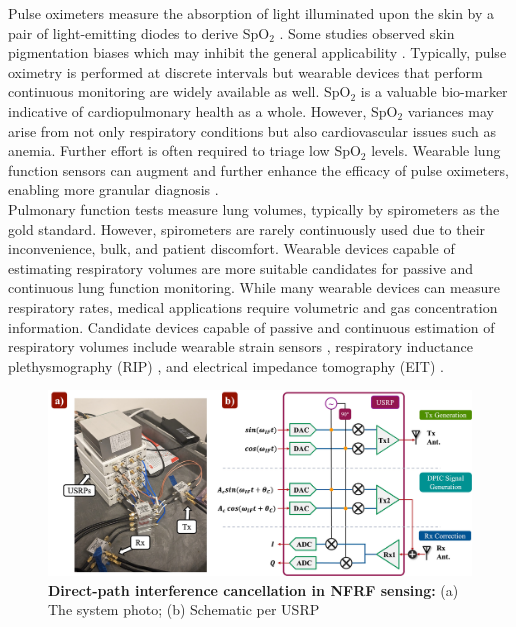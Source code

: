 \documentclass[journal]{IEEEtran}
\begin{document}
Pulse oximeters measure the absorption of light illuminated upon the skin by a pair of light-emitting diodes to derive SpO$_2$ \cite{jubranPulseOximetry2015}. Some studies observed skin pigmentation biases which may inhibit the general applicability \cite{cabanasSkinPigmentationInfluence2022}. Typically, pulse oximetry is performed at discrete intervals but wearable devices that perform continuous monitoring are widely available as well. SpO$_2$ is a valuable bio-marker indicative of cardiopulmonary health as a whole. However, SpO$_2$ variances may arise from not only respiratory conditions but also cardiovascular issues such as anemia. Further effort is often required to triage low SpO$_2$ levels. Wearable lung function sensors can augment and further enhance the efficacy of pulse oximeters, enabling more granular diagnosis \cite{buekersWearableFingerPulse2019}\cite{buekersOxygenSaturationMeasurements2018}. \\
Pulmonary function tests measure lung volumes, typically by spirometers \cite{poncePulmonaryFunctionTests2024} as the gold standard. However, spirometers are rarely continuously used due to their inconvenience, bulk, and patient discomfort. Wearable devices capable of estimating respiratory volumes are more suitable candidates for passive and continuous lung function monitoring. While many wearable devices can measure respiratory rates, medical applications require volumetric and gas concentration information. Candidate devices capable of passive and continuous estimation of respiratory volumes include wearable strain sensors \cite{chuRespirationRateVolume2019}, respiratory inductance plethysmography (RIP) \cite{vitazkovaAdvancesRespiratoryMonitoring2024}, and electrical impedance tomography (EIT) \cite{adlerMonitoringChangesLung1997}. \\
\begin{figure}[htbp]
\centering
\includegraphics[width=.95\textwidth]{dpic_v2.jpg}
\caption{\textbf{Direct-path interference cancellation in NFRF sensing:} (a) The system photo; (b) Schematic per USRP}
\label{fig:dpic}
\end{figure}
\end{document}
